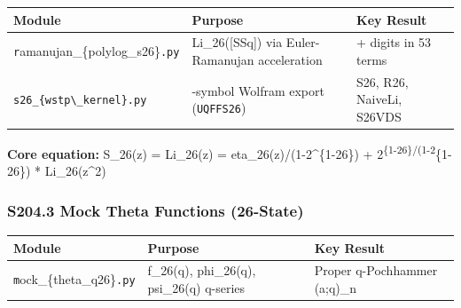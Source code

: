 \documentclass[
  11pt,
]{article}
\newcounter{none} %
\begin{document}
{\def\LTcaptype{none} %
\begin{longtable}[]{@{}
  >{\raggedright\arraybackslash}p{}
  >{\raggedright\arraybackslash}p{}
  >{\raggedright\arraybackslash}p{}@{}}
\toprule\noalign{}
\begin{minipage}[b]{\linewidth}\raggedright
Module
\end{minipage} & \begin{minipage}[b]{\linewidth}\raggedright
Purpose
\end{minipage} & \begin{minipage}[b]{\linewidth}\raggedright
Key Result
\end{minipage} \\
\midrule\noalign{}
\endhead
\bottomrule\noalign{}
\endlastfoot
\texttt{r}amanujan\_\{polylog\_s26\}\texttt{.py} & Li\_26({[}SSq{]}) via
Euler-Ramanujan acceleration & 15.7+ digits in 53 terms \\
\texttt{s26\_\{wstp\textbackslash{}\_kernel\}.py} & 8-symbol Wolfram
export (\texttt{UQFFS26}) & S26, R26, NaiveLi, S26VDS \\
\end{longtable}
}

\textbf{Core equation:} S\_26(z) = Li\_26(z) =
eta\_26(z)/(1-2\^{}\{1-26\}) + 2\textsuperscript{\{1-26\}/(1-2}\{1-26\})
* Li\_26(z\^{}2)

\subsubsection{S204.3 Mock Theta Functions
(26-State)}\label{s204.3-mock-theta-functions-26-state}

{\def\LTcaptype{none} %
\begin{longtable}[]{@{}
  >{\raggedright\arraybackslash}p{}
  >{\raggedright\arraybackslash}p{}
  >{\raggedright\arraybackslash}p{}@{}}
\toprule\noalign{}
\begin{minipage}[b]{\linewidth}\raggedright
Module
\end{minipage} & \begin{minipage}[b]{\linewidth}\raggedright
Purpose
\end{minipage} & \begin{minipage}[b]{\linewidth}\raggedright
Key Result
\end{minipage} \\
\midrule\noalign{}
\endhead
\bottomrule\noalign{}
\endlastfoot
\texttt{m}ock\_\{theta\_q26\}\texttt{.py} & f\_26(q), phi\_26(q),
psi\_26(q) q-series & Proper q-Pochhammer (a;q)\_n \\
\end{longtable}
}
\end{document}
